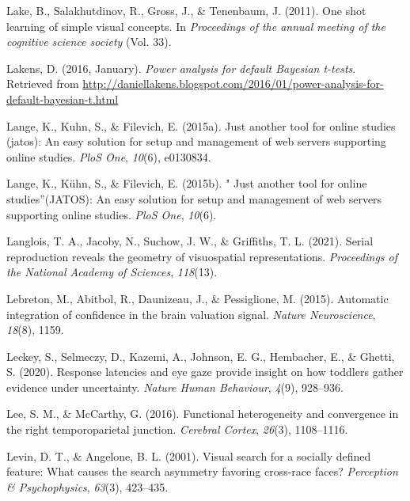 \documentclass[12pt,twoside]{reedthesis}
\begin{document}
\leavevmode\hypertarget{ref-lake2011one}{}%
Lake, B., Salakhutdinov, R., Gross, J., \& Tenenbaum, J. (2011). One shot learning of simple visual concepts. In \emph{Proceedings of the annual meeting of the cognitive science society} (Vol. 33).

\leavevmode\hypertarget{ref-lakens_2016}{}%
Lakens, D. (2016, January). \emph{Power analysis for default Bayesian t-tests}. Retrieved from \url{http://daniellakens.blogspot.com/2016/01/power-analysis-for-default-bayesian-t.html}

\leavevmode\hypertarget{ref-lange2015jatos}{}%
Lange, K., Kuhn, S., \& Filevich, E. (2015a). Just another tool for online studies (jatos): An easy solution for setup and management of web servers supporting online studies. \emph{PloS One}, \emph{10}(6), e0130834.

\leavevmode\hypertarget{ref-lange2015just}{}%
Lange, K., Kühn, S., \& Filevich, E. (2015b). " Just another tool for online studies''(JATOS): An easy solution for setup and management of web servers supporting online studies. \emph{PloS One}, \emph{10}(6).

\leavevmode\hypertarget{ref-langlois2021serial}{}%
Langlois, T. A., Jacoby, N., Suchow, J. W., \& Griffiths, T. L. (2021). Serial reproduction reveals the geometry of visuospatial representations. \emph{Proceedings of the National Academy of Sciences}, \emph{118}(13).

\leavevmode\hypertarget{ref-lebreton2015automatic}{}%
Lebreton, M., Abitbol, R., Daunizeau, J., \& Pessiglione, M. (2015). Automatic integration of confidence in the brain valuation signal. \emph{Nature Neuroscience}, \emph{18}(8), 1159.

\leavevmode\hypertarget{ref-leckey2020response}{}%
Leckey, S., Selmeczy, D., Kazemi, A., Johnson, E. G., Hembacher, E., \& Ghetti, S. (2020). Response latencies and eye gaze provide insight on how toddlers gather evidence under uncertainty. \emph{Nature Human Behaviour}, \emph{4}(9), 928--936.

\leavevmode\hypertarget{ref-lee2016functional}{}%
Lee, S. M., \& McCarthy, G. (2016). Functional heterogeneity and convergence in the right temporoparietal junction. \emph{Cerebral Cortex}, \emph{26}(3), 1108--1116.

\leavevmode\hypertarget{ref-levin2001visual}{}%
Levin, D. T., \& Angelone, B. L. (2001). Visual search for a socially defined feature: What causes the search asymmetry favoring cross-race faces? \emph{Perception \& Psychophysics}, \emph{63}(3), 423--435.
\end{document}
